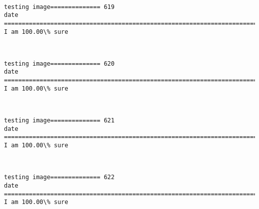 \documentclass[11pt]{article}
\begin{document}
    \begin{center}
    \end{center}
    { \hspace*{\fill} \\}
    
    \begin{Verbatim}[commandchars=\\\{\}]
testing image============== 619
date
============================================================================
I am 100.00\% sure

    \end{Verbatim}

    \begin{center}
    \end{center}
    { \hspace*{\fill} \\}
    
    \begin{Verbatim}[commandchars=\\\{\}]
testing image============== 620
date
============================================================================
I am 100.00\% sure

    \end{Verbatim}

    \begin{center}
    \end{center}
    { \hspace*{\fill} \\}
    
    \begin{Verbatim}[commandchars=\\\{\}]
testing image============== 621
date
============================================================================
I am 100.00\% sure

    \end{Verbatim}

    \begin{center}
    \end{center}
    { \hspace*{\fill} \\}
    
    \begin{Verbatim}[commandchars=\\\{\}]
testing image============== 622
date
============================================================================
I am 100.00\% sure

    \end{Verbatim}
\end{document}
